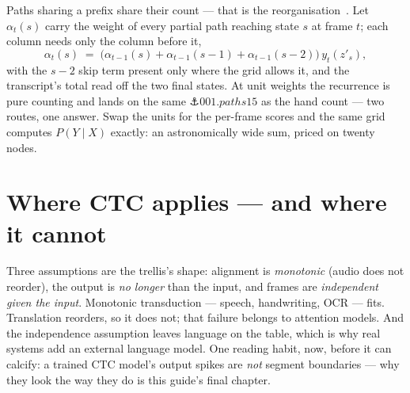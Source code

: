 \begin{narrative}
\begin{center}
\end{center}

Paths sharing a prefix share their count — that is the
reorganisation~\cite{deep_learning-hannun-sequence-modeling-with-ctc-distill-2017}.
Let $\alpha_t(s)$ carry the weight of every partial path reaching state
$s$ at frame $t$; each column needs only the column before it,
\[
  \alpha_t(s) \;=\; \bigl(\alpha_{t-1}(s) + \alpha_{t-1}(s{-}1)
    + \alpha_{t-1}(s{-}2)\bigr)\, y_t(z'_s),
\]
with the $s{-}2$ skip term present only where the grid allows it, and
the transcript's total read off the two final states. At unit weights
the recurrence is pure counting and lands on the same
$\anchor{001.paths15}$ as the hand count — two routes, one answer.
Swap the units for the per-frame scores and the same grid computes
$P(Y \mid X)$ exactly: an astronomically wide sum, priced on twenty
nodes.

\section{Where CTC applies — and where it cannot}

Three assumptions are the trellis's shape: alignment is
\emph{monotonic} (audio does not reorder), the output is \emph{no longer}
than the input, and frames are \emph{independent given the input}.
Monotonic transduction — speech, handwriting, OCR — fits. Translation
reorders, so it does not; that failure belongs to attention models.
And the independence assumption leaves language on the table, which is
why real systems add an external language model. One reading habit,
now, before it can calcify: a trained CTC model's output spikes are
\emph{not} segment boundaries — why they look the way they do is this
guide's final chapter.


\end{narrative}
